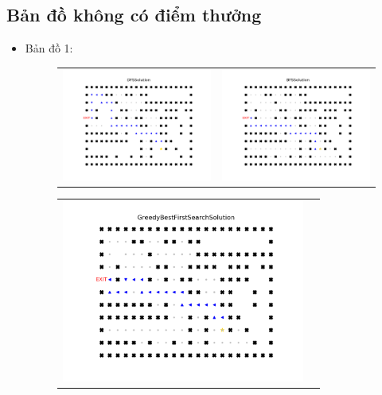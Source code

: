 \documentclass[11pt]{scrartcl} %
\begin{document}
\subsection{Bản đồ không có điểm thưởng}
\begin{itemize}
	\item Bản đồ 1:
		\begin{figure}[h] \label{123}
			\centering
			\begin{tabular}{cc}
				\includegraphics[width=8cm]{Figures/fg1_dfs.png} &
				\includegraphics[width=8cm]{Figures/fg1_bfs.png} \\
			\end{tabular}
		\end{figure}
		\begin{figure}[h] \label{fig:three-alternative-operations}
			\centering
			\begin{tabular}{cc}
				\includegraphics[width=8cm]{Figures/fg1_gbfs.png} &

\end{tabular}
\end{figure}
\end{itemize}
\end{document}
